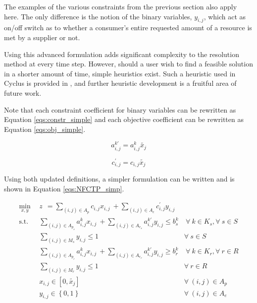 The examples of the various constraints from the previous section also apply
here. The only difference is the notion of the binary variables, $y_{i,j}$,
which act as on/off switch as to whether a consumer's entire requested amount of
a resource is met by a supplier or not. 

Using this advanced formulation adds significant complexity to the resolution
method at every time step. However, should a user wish to find a feasible
solution in a shorter amount of time, simple heuristics exist. Such a heuristic
used in Cyclus is provided in , and further heuristic
development is a fruitful area of future work.

Note that each constraint coefficient for binary variables can be rewritten as
Equation \ref{eqs:constr_simple} and each objective coefficient can be rewritten
as Equation \ref{eqs:obj_simple}.

\begin{equation}\label{eqs:constr_simple}
a^{k\prime}_{i,j} = a^k_{i,j} \tilde{x_j}
\end{equation}

\begin{equation}\label{eqs:obj_simple}
c^{\prime}_{i,j} = c_{i,j} \tilde{x_j}
\end{equation}

Using both updated definitions, a simpler formulation can be written and is shown
in Equation \ref{eqs:NFCTP_simp}.

\begin{subequations}\label{eqs:NFCTP_simp}
  \begin{align}
    \min_{x, y} \:\: 
    & 
    z \:\: = 
    \sum_{(i, j) \in A_p} c_{i,j} x_{i,j} 
    \: + 
    \sum_{(i, j) \in A_e} c^{\prime}_{i,j} y_{i,j} 
    & 
    \label{eqs:NFCTP_simp_obj} \\
    \text{s.t.} \:\: 
    &
    \sum_{(i, j) \in A_{p_s}} a^k_{i,j} x_{i,j}
    \: + 
    \sum_{(i, j) \in A_{e_s}} a^{k\prime}_{i,j} y_{i,j}
    \leq b^k_s 
    &
    \: 
    \forall \: k \in K_s, 
    \forall \: s \in S 
    \label{eqs:NFCTP_simp_sup} \\
    &
    \sum_{(i, j) \in M_{s}} y_{i,j} \leq 1 
    &
    \forall \: s \in S 
    \label{eqs:NFCTP_simp_mut_sup} \\
    &
    \sum_{(i, j) \in A_{p_r}} a^k_{i,j} x_{i,j}
    \: + 
    \sum_{(i, j) \in A_{e_r}} a^{k\prime}_{i,j} y_{i,j}
    \geq b^k_r 
    &
    \: 
    \forall \: k \in K_r,  
    \forall \: r \in R 
    \label{eqs:NFCTP_simp_req} \\
    &
    \sum_{(i, j) \in M_{r}} y_{i,j} \leq 1 
    &
    \forall \: r \in R 
    \label{eqs:NFCTP_simp_mut_req} \\
    &
    x_{i,j} \in [0, \tilde{x_j}]
    &
    \forall \: (i, j) \in A_p
    \label{eqs:NFCTP_simp_x} \\
    &
    y_{i,j} \in \left\{ 0, 1 \right\}
    &
    \forall \: (i, j) \in A_e
    \label{eqs:NFCTP_simp_y}
  \end{align}
\end{subequations}


